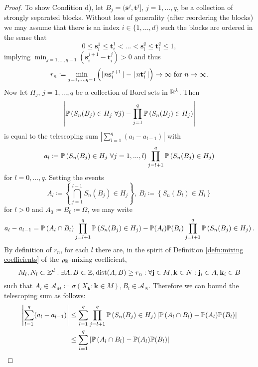 \begin{proof}
    To show Condition d), let $B_j = (\mathbf{s}^j, \mathbf{t}^j]$, $j = 1, ..., q$, be a collection of strongly separated blocks. Without loss of generality (after reordering the blocks) we may assume that there is an index $i \in \{1, ..., d\}$ such the blocks are ordered in the sense that
    \[ 0 \leq \mathbf{s}^1_i \leq \mathbf{t}^1_i < ... < \mathbf{s}^q_i \leq \mathbf{t}^q_i \leq 1, \]
    implying $\min_{j=1, ..., q-1}(\mathbf{s}_{i}^{j+1} - \mathbf{t}_i^{j}) > 0$ and thus
    \begin{equation} \label{lemma3: min difference diverging}
        r_n \coloneqq \min\limits_{j = 1, ..., q-1} \left( \floor{n \mathbf{s}_i^{j+1}} - \floor{n \mathbf{t}_i^{j}} \right) \to \infty \ \text{for } n \to \infty. 
    \end{equation}
    Now let $H_j$, $j = 1, ..., q$ be a collection of Borel-sets in $\mathbb{R}^k$. Then 
    \[ \left| \mathbb{P}\left( S_n(B_j) \in H_j \ \forall j \right) - \prod\limits_{j=1}^q \mathbb{P}\left(S_n(B_j) \in H_j\right) \right| \]
    is equal to the telescoping sum $\left|\sum\limits_{l=1}^{q} (a_{l} - a_{l-1})\right|$ with
    \[ a_l \coloneqq \mathbb{P}\left( S_n(B_j) \in H_j \ \forall j = 1, ..., l \right) \prod\limits_{j=l+1}^{q} \mathbb{P}\left( S_n(B_j) \in H_j \right) \]
    for $l = 0, ..., q$. Setting the events
    \[ A_l \coloneqq \left\{ \bigcap\limits_{j = 1}^{l-1} S_n(B_j) \in H_j \right\}, \ B_l \coloneqq \left\{ S_n(B_{l}) \in  H_{l} \right\} \]
    for $l > 0$ and $A_0 \coloneqq B_0 \coloneqq \Omega$, we may write
    \[ a_l - a_{l-1} = \mathbb{P}\left( A_l \cap B_l \right) \prod\limits_{j=l+1}^{q} \mathbb{P}\left( S_n(B_j) \in H_j \right) - \mathbb{P}(A_l) \mathbb{P}(B_l) \prod\limits_{j=l+1}^{q} \mathbb{P}\left( S_n(B_j) \in H_j \right). \]
    By definition of $r_n$, for each $l$ there are, in the spirit of Definition \ref{defn:mixing coefficients} of the $\rho_{\mathbb{R}}$-mixing coefficient,
    \[ M_l, N_l \subset \mathbb{Z}^d: \exists A, B \subset \mathbb{Z}, \mathrm{dist}(A, B) \geq r_n: \forall \mathbf{j} \in M, \mathbf{k} \in N: \mathbf{j}_i \in A, \mathbf{k}_i \in B \]
    such that $A_l \in \mathcal{A}_M \coloneqq \sigma(X_\mathbf{k}: \mathbf{k} \in M), B_l \in \mathcal{A}_N$.
    Therefore we can bound the telescoping sum as follows:
    \begin{align*}
        \left|\sum\limits_{l=1}^{q} (a_{l} - a_{l-1})\right|
        & \leq \sum\limits_{l=1}^{q} \prod\limits_{j=l+1}^{q} \PP\left( S_n(B_j) \in H_j \right) \left| \PP\left( A_l \cap B_l \right)  - \PP(A_l) \PP(B_l) \right| \\
        & \leq \sum\limits_{l=1}^{q} \left| \PP\left( A_l \cap B_l \right)  - \PP(A_l) \PP(B_l) \right| \\

\end{align*}
\end{proof}
